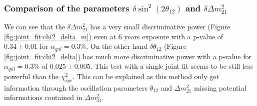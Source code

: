 \documentclass[../main.tex]{subfiles}
\begin{document}
\subsubsection{Comparison of the parameters $\delta \sin^2(2\theta_{12})$ and $\delta \Delta m^2_{21}$}

We can see that the $\delta \Delta m^2_{21}$ has a very small discriminative power (Figure \ref{fig:joint_fit:chi2_delta_m}) even at 6 years exposure with a p-value of $0.34 \pm 0.01$ for $\alpha_{qnl} = 0.3\%$. On the other hand $\delta \theta_{12}$ (Figure \ref{fig:joint_fit:chi2_delta}) has much more discriminative power with a p-value for $\alpha_{qnl} = 0.3\%$ of $0.025 \pm 0.005$. This test with a single joint fit seems to be still less powerful than the $\chi^2_{spe}$. This can be explained as this method only get information through the oscillation parameters $\theta_{12}$ and $\Delta m^2_{21}$ missing potential informations contained in $\Delta m^2_{31}$.
\end{document}

